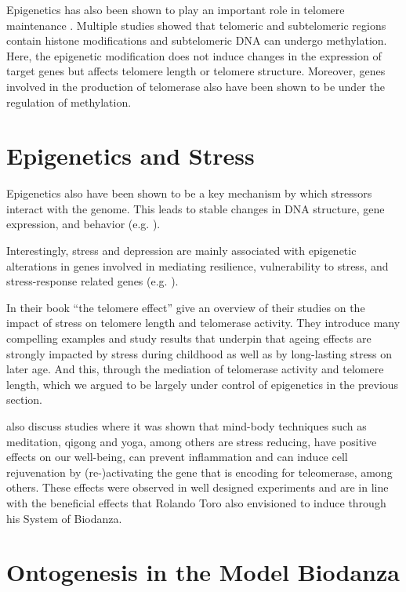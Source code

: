 \documentclass[
  11pt,
]{book}
\begin{document}
Epigenetics has also been shown to play an important role in telomere maintenance \citep{Adwan2018}.
Multiple studies showed that telomeric and subtelomeric regions contain histone modifications and subtelomeric DNA can undergo methylation.
Here, the epigenetic modification does not induce changes in the expression of target genes but affects telomere length or telomere structure.
Moreover, genes involved in the production of telomerase also have been shown to be under the regulation of methylation.

\hypertarget{epigenetics-and-stress}{%
\section{Epigenetics and Stress}\label{epigenetics-and-stress}}

Epigenetics also have been shown to be a key mechanism by which stressors interact with the genome.
This leads to stable changes in DNA structure, gene expression, and behavior (e.g. \citet{Park2019}).

Interestingly, stress and depression are mainly
associated with epigenetic alterations in genes involved in mediating resilience, vulnerability to stress, and stress-response related genes (e.g. \citet{Park2019}).

In their book ``the telomere effect'' \citet{BlackburnEpel2017} give an overview of their studies on the impact of stress on telomere length and telomerase activity.
They introduce many compelling examples and study results that underpin that ageing effects are strongly impacted by stress during childhood as well as by long-lasting stress on later age. And this, through the mediation of telomerase activity and telomere length, which we argued to be largely under control of epigenetics in the previous section.

\citet{BlackburnEpel2017} also discuss studies where it was shown that mind-body techniques such as meditation, qigong and yoga, among others are stress reducing, have positive effects on our well-being, can prevent inflammation and can induce cell rejuvenation by (re-)activating the gene that is encoding for teleomerase, among others. These effects were observed in well designed experiments and are in line with the beneficial effects that Rolando Toro also envisioned to induce through his System of Biodanza.

\hypertarget{ontogenesis-in-the-model-biodanza}{%
\section{Ontogenesis in the Model Biodanza}\label{ontogenesis-in-the-model-biodanza}}
\end{document}
